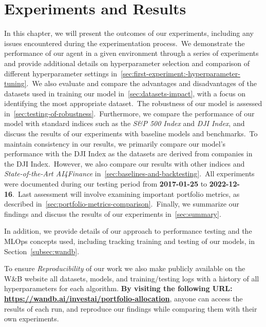 \documentclass[../xlapes02]{subfiles}
\begin{document}
    \chapter{Experiments and Results}\label{ch:experiments-and-results}
    In this chapter, we will present the outcomes of our experiments, including any issues encountered during the experimentation process.\ We demonstrate the performance of our agent in a given environment through a series of experiments and provide additional details on hyperparameter selection and comparison of different hyperparameter settings in~\cref{sec:first-experiment:-hyperparameter-tuning}.\ We also evaluate and compare the advantages and disadvantages of the datasets used in training our model in~\ref{sec:datasets-impact}, with a focus on identifying the most appropriate dataset.\ The robustness of our model is assessed in~\ref{sec:testing-of-robustness}.\ Furthermore, we compare the performance of our model with standard indices such as the \emph{S\&P 500 Index} and \emph{DJI Index}, and discuss the results of our experiments with baseline models and benchmarks.\ To maintain consistency in our results, we primarily compare our model's performance with the DJI Index as the datasets are derived from companies in the DJI Index.\ However, we also compare our results with other indices and \emph{State-of-the-Art AI4Finance} in~\ref{sec:baselines-and-backtesting}.\ All experiments were documented during our testing period from \textbf{2017-01-25} to \textbf{2022-12-16}.\ Last assessment will involve examining important portfolio metrics, as described in~\cref{sec:portfolio-metrics-comparison}.\ Finally, we summarize our findings and discuss the results of our experiments in~\ref{sec:summary}.

    In addition, we provide details of our approach to performance testing and the MLOps concepts used, including tracking training and testing of our models, in Section~\ref{subsec:wandb}.

    To ensure \emph{Reproducibility} of our work we also make publicly available on the W\&B website all datasets, models, and training/testing logs with a history of all hyperparameters for each algorithm. \textbf{By visiting the following URL: \url{https://wandb.ai/investai/portfolio-allocation}}, anyone can access the results of each run, and reproduce our findings while comparing them with their own experiments.
\end{document}
